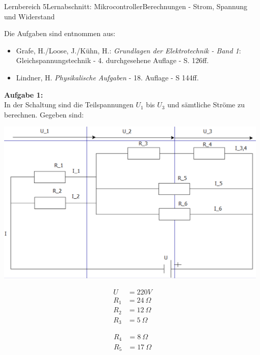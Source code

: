 \documentclass[oneside,openany,headings=optiontotoc,11pt,numbers=noenddot]{scrreprt}
\begin{document}
		\begin{worksheet}{Lernbereich 5}{Lernabschnitt: Mikrocontroller}{Berechnungen - Strom, Spannung und Widerstand}
			\begin{framed}
				\noindent
				\tiny{Die Aufgaben sind entnommen aus:
					\begin{itemize}
						\item Grafe, H./Loose, J./Kühn, H.: \textit{Grundlagen der Elektrotechnik - Band 1}: Gleichspannungstechnik - 4. durchgesehene Auflage - S. 126ff.
						\item Lindner, H. \textit{Physikalische Aufgaben} - 18. Auflage - S 144ff.
					\end{itemize}}\normalsize
				\textbf{Aufgabe 1:}\\
				In der Schaltung sind die Teilspannungen \(U_1\) bis \(U_3\) und sämtliche Ströme zu berechnen. Gegeben sind:\\
				\begin{minipage}[c]{0.48\textwidth}
					\includegraphics[width=0.98\textwidth]{../99_Bilder/A1.png}
				\end{minipage}
				\hfill
				\begin{minipage}[c]{0.24\textwidth}
					\begin{align*}
						U & = 220V\\
						R_1 & = 24\ \Omega\\
						R_2 & = 12\ \Omega\\
						R_3 & = 5\ \Omega
					\end{align*}
				\end{minipage}
				\hfill
				\begin{minipage}[c]{0.24\textwidth}
					\begin{align*}
						R_4 & = 8\ \Omega\\
						R_5 & = 17\ \Omega\\

\end{align*}
\end{minipage}
\end{framed}
\end{worksheet}
\end{document}
